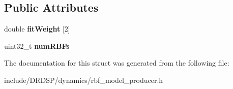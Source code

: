 \subsection*{Public Attributes}
\begin{DoxyCompactItemize}
\item 
\hypertarget{struct_d_r_d_s_p_1_1_r_b_f_model_producer_ac64f97b126182e3f9bef0a0934767c20}{double {\bfseries fit\-Weight} \mbox{[}2\mbox{]}}\label{struct_d_r_d_s_p_1_1_r_b_f_model_producer_ac64f97b126182e3f9bef0a0934767c20}

\item 
\hypertarget{struct_d_r_d_s_p_1_1_r_b_f_model_producer_ad96a3b2665452ee31392390729f817a9}{uint32\-\_\-t {\bfseries num\-R\-B\-Fs}}\label{struct_d_r_d_s_p_1_1_r_b_f_model_producer_ad96a3b2665452ee31392390729f817a9}

\end{DoxyCompactItemize}


The documentation for this struct was generated from the following file\-:\begin{DoxyCompactItemize}
\item 
include/\-D\-R\-D\-S\-P/dynamics/rbf\-\_\-model\-\_\-producer.\-h\end{DoxyCompactItemize}
